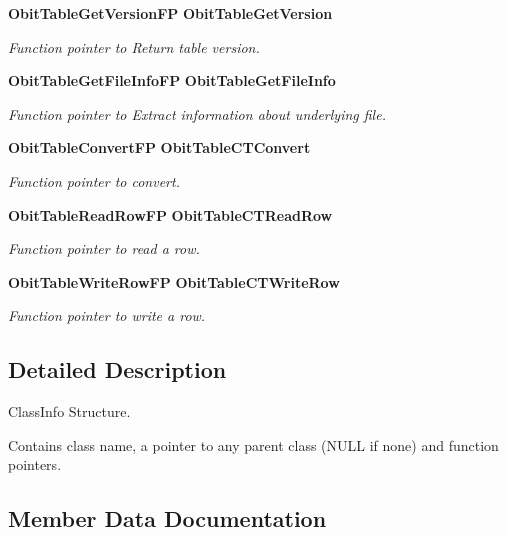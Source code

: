 \begin{CompactItemize}
{\bf Obit\-Table\-Get\-Version\-FP} {\bf Obit\-Table\-Get\-Version}
\begin{CompactList}\small\item\em Function pointer to Return table version. \item\end{CompactList}\item 
{\bf Obit\-Table\-Get\-File\-Info\-FP} {\bf Obit\-Table\-Get\-File\-Info}
\begin{CompactList}\small\item\em Function pointer to Extract information about underlying file. \item\end{CompactList}\item 
{\bf Obit\-Table\-Convert\-FP} {\bf Obit\-Table\-CTConvert}
\begin{CompactList}\small\item\em Function pointer to convert. \item\end{CompactList}\item 
{\bf Obit\-Table\-Read\-Row\-FP} {\bf Obit\-Table\-CTRead\-Row}
\begin{CompactList}\small\item\em Function pointer to read a row. \item\end{CompactList}\item 
{\bf Obit\-Table\-Write\-Row\-FP} {\bf Obit\-Table\-CTWrite\-Row}
\begin{CompactList}\small\item\em Function pointer to write a row. \item\end{CompactList}\end{CompactItemize}


\subsection{Detailed Description}
Class\-Info Structure. 

Contains class name, a pointer to any parent class (NULL if none) and function pointers. 



\subsection{Member Data Documentation}
